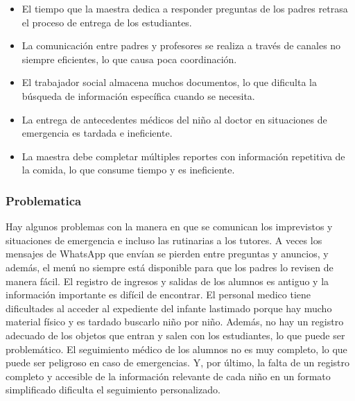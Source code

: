 \documentclass{article}
\begin{document}
\begin{itemize}
	\item El tiempo que la maestra dedica a responder preguntas de los padres retrasa el proceso de entrega de los estudiantes.
	\item La comunicación entre padres y profesores se realiza a través de canales no siempre eficientes, lo que causa poca coordinación.
	\item El trabajador social almacena muchos documentos, lo que dificulta la búsqueda de información específica cuando se necesita.
	\item La entrega de antecedentes médicos del niño al doctor en situaciones de emergencia es tardada e ineficiente.
	\item La maestra debe completar múltiples reportes con información repetitiva de la comida, lo que consume tiempo y es ineficiente.
\end{itemize}

\subsubsection{Problematica}

Hay algunos problemas con la manera en que se comunican los imprevistos y situaciones de emergencia e incluso las rutinarias a los tutores. A veces los mensajes de WhatsApp que envían se pierden entre preguntas y anuncios, y además, el menú no siempre está disponible para que los padres lo revisen de manera fácil. El registro de ingresos y salidas de los alumnos es antiguo y la información importante es difícil de encontrar.
El personal medico tiene dificultades al acceder al expediente del infante lastimado porque hay mucho material físico y es tardado buscarlo niño por niño.
Además, no hay un registro adecuado de los objetos que entran y salen con los estudiantes, lo que puede ser problemático. El seguimiento médico de los alumnos no es muy completo, lo que puede ser peligroso en caso de emergencias. Y, por último, la falta de un registro completo y accesible de la información relevante de cada niño en un formato simplificado dificulta el seguimiento personalizado.
\end{document}
